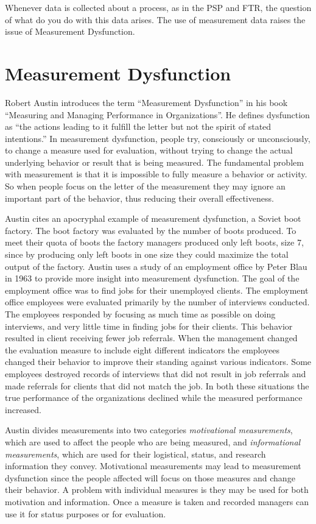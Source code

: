 Whenever data is collected about a process, as in the PSP and FTR, the question 
of what do you do with this data arises.  The use of measurement data raises
the issue of Measurement Dysfunction.

\section{Measurement Dysfunction}

Robert Austin introduces the term ``Measurement Dysfunction'' in his book
``Measuring and Managing Performance in Organizations''\cite{Austin96}. He
defines dysfunction as ``the actions leading to it fulfill the letter but not
the spirit of stated intentions.'' In measurement dysfunction, people try,
consciously or unconsciously, to change a measure used for evaluation, without
trying to change the actual underlying behavior or result that is being
measured. The fundamental problem with measurement is that it is impossible to
fully measure a behavior or activity.  So when people focus on the letter of
the measurement they may ignore an important part of the behavior, thus
reducing their overall effectiveness.

Austin cites an apocryphal example of measurement dysfunction, a Soviet boot
factory.  The boot factory was evaluated by the number of boots produced. To
meet their quota of boots the factory managers produced only left boots, size
7, since by producing only left boots in one size they could maximize the
total output of the factory. Austin uses a study of an employment office by
Peter Blau in 1963\cite{Blau63} to provide more insight into measurement
dysfunction.  The goal of the employment office was to find jobs for their
unemployed clients.  The employment office employees were evaluated primarily
by the number of interviews conducted.  The employees responded by focusing as
much time as possible on doing interviews, and very little time in finding jobs
for their clients. This behavior resulted in client receiving fewer job
referrals. When the management changed the evaluation measure to include eight
different indicators the employees changed their behavior to improve their
standing against various indicators.  Some employees destroyed records of
interviews that did not result in job referrals and made referrals for clients
that did not match the job. In both these situations the true performance of
the organizations declined while the measured performance increased.

Austin divides measurements into two categories {\em motivational
  measurements}, which are used to affect the people who are being measured,
and {\em informational measurements}, which are used for their logistical,
status, and research information they convey.  Motivational measurements may
lead to measurement dysfunction since the people affected will focus on those
measures and change their behavior. A problem with individual measures is they
may be used for both motivation and information.  Once a measure is taken and
recorded managers can use it for status purposes or for evaluation. 

